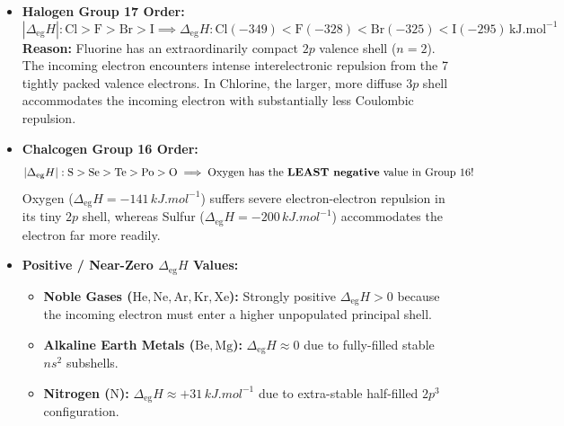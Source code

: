 \documentclass[10pt,a4paper]{article}
\begin{document}
\begin{trapbox}
\begin{itemize}
  \item \textbf{Halogen Group 17 Order:}
  \begin{equation}
    |\Delta_{\text{eg}} H|: \mathbf{\mathrm{Cl > F > Br > I}} \implies \Delta_{\text{eg}} H: \mathrm{Cl (-349) < F (-328) < Br (-325) < I (-295)\,\si{kJ.mol^{-1}}}
  \end{equation}
  \textbf{Reason:} Fluorine has an extraordinarily compact $2p$ valence shell ($n=2$). The incoming electron encounters intense interelectronic repulsion from the 7 tightly packed valence electrons. In Chlorine, the larger, more diffuse $3p$ shell accommodates the incoming electron with substantially less Coulombic repulsion.
  \item \textbf{Chalcogen Group 16 Order:}
  \begin{equation}
    |\Delta_{\text{eg}} H|: \mathbf{\mathrm{S > Se > Te > Po > O}} \implies \text{Oxygen has the \textbf{LEAST negative} value in Group 16!}
  \end{equation}
  Oxygen ($\Delta_{\text{eg}} H = -141\,\si{kJ.mol^{-1}}$) suffers severe electron-electron repulsion in its tiny $2p$ shell, whereas Sulfur ($\Delta_{\text{eg}} H = -200\,\si{kJ.mol^{-1}}$) accommodates the electron far more readily.
  \item \textbf{Positive / Near-Zero $\Delta_{\text{eg}} H$ Values:}
  \begin{itemize}
    \item \textbf{Noble Gases ($\mathrm{He, Ne, Ar, Kr, Xe}$):} Strongly positive $\Delta_{\text{eg}} H > 0$ because the incoming electron must enter a higher unpopulated principal shell.
    \item \textbf{Alkaline Earth Metals ($\mathrm{Be, Mg}$):} $\Delta_{\text{eg}} H \approx 0$ due to fully-filled stable $ns^2$ subshells.
    \item \textbf{Nitrogen ($\mathrm{N}$):} $\Delta_{\text{eg}} H \approx +31\,\si{kJ.mol^{-1}}$ due to extra-stable half-filled $2p^3$ configuration.
  \end{itemize}
\end{itemize}
\end{trapbox}
\end{document}
